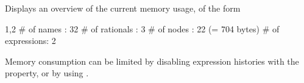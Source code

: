 
Displays an overview of the current memory usage, of the form
\begin{screen}{1,2}
# of names      : 32
# of rationals  : 3
# of nodes      : 22 (= 704 bytes)
# of expressions: 2
\end{screen}
Memory consumption can be limited by disabling expression histories
with the  property, or by
using .


